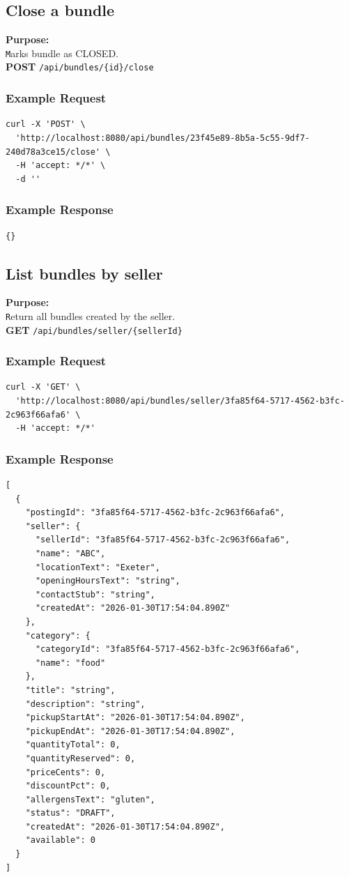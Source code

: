 \documentclass[a4paper,11pt]{article}
\begin{document}
\subsection{Close a bundle}
\textbf{Purpose:} \\ \texttt Marks bundle as CLOSED. \\

\textbf{POST} \texttt{/api/bundles/\{id\}/close}

\subsubsection*{Example Request}
\begin{lstlisting}
curl -X 'POST' \
  'http://localhost:8080/api/bundles/23f45e89-8b5a-5c55-9df7-240d78a3ce15/close' \
  -H 'accept: */*' \
  -d ''
\end{lstlisting}

\subsubsection*{Example Response}
\begin{lstlisting}
{}
\end{lstlisting}

\subsection{List bundles by seller}
\textbf{Purpose:} \\ \texttt Return all bundles created by the seller. \\

\textbf{GET} \texttt{/api/bundles/seller/\{sellerId\}}

\subsubsection*{Example Request}
\begin{lstlisting}
curl -X 'GET' \
  'http://localhost:8080/api/bundles/seller/3fa85f64-5717-4562-b3fc-2c963f66afa6' \
  -H 'accept: */*'
\end{lstlisting}

\subsubsection*{Example Response}
\begin{lstlisting}
[
  {
    "postingId": "3fa85f64-5717-4562-b3fc-2c963f66afa6",
    "seller": {
      "sellerId": "3fa85f64-5717-4562-b3fc-2c963f66afa6",
      "name": "ABC",
      "locationText": "Exeter",
      "openingHoursText": "string",
      "contactStub": "string",
      "createdAt": "2026-01-30T17:54:04.890Z"
    },
    "category": {
      "categoryId": "3fa85f64-5717-4562-b3fc-2c963f66afa6",
      "name": "food"
    },
    "title": "string",
    "description": "string",
    "pickupStartAt": "2026-01-30T17:54:04.890Z",
    "pickupEndAt": "2026-01-30T17:54:04.890Z",
    "quantityTotal": 0,
    "quantityReserved": 0,
    "priceCents": 0,
    "discountPct": 0,
    "allergensText": "gluten",
    "status": "DRAFT",
    "createdAt": "2026-01-30T17:54:04.890Z",
    "available": 0
  }
]
\end{lstlisting}
\end{document}
